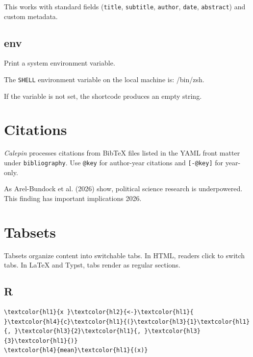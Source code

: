 \documentclass[11pt]{article}
\begin{document}
This works with standard fields (\texttt{title}, \texttt{subtitle}, \texttt{author}, \texttt{date}, \texttt{abstract}) and custom metadata.

\subsection*{env}
\label{env}

Print a system environment variable.

The \texttt{SHELL} environment variable on the local machine is: /bin/zsh.

If the variable is not set, the shortcode produces an empty string.

\section*{Citations}
\label{citations}

\emph{Calepin} processes citations from BibTeX files listed in the YAML front matter under \texttt{bibliography}. Use \texttt{@key} for author-year citations and \texttt{{[}-@key{]}} for year-only.

As Arel-Bundock et al. (2026) show, political science research is underpowered. This finding has important implications 2026.

\section*{Tabsets}
\label{tabsets}

Tabsets organize content into switchable tabs. In HTML, readers click to switch tabs. In LaTeX and Typst, tabs render as regular sections.



\subsection*{R}
\label{r}



\begin{srccode}
\begin{Verbatim}[commandchars=\\\{\}]
\textcolor{hl1}{x }\textcolor{hl2}{<-}\textcolor{hl1}{ }\textcolor{hl4}{c}\textcolor{hl1}{(}\textcolor{hl3}{1}\textcolor{hl1}{, }\textcolor{hl3}{2}\textcolor{hl1}{, }\textcolor{hl3}{3}\textcolor{hl1}{)}
\textcolor{hl4}{mean}\textcolor{hl1}{(x)}
\end{Verbatim}
\end{srccode}
\end{document}
